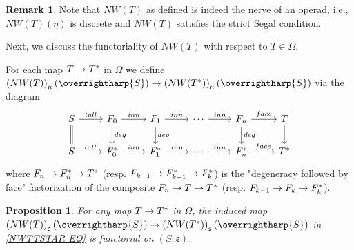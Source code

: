 \documentclass[a4paper,10pt
,draft
]{article}%
\numberwithin{equation}{section}
\numberwithin{figure}{section}
\newtheorem{proposition}[equation]{Proposition}%
\theoremstyle{definition} %
\newtheorem{remark}[equation]{Remark}%
\newcommand{\vect}[1]{\text{\overrightharp{\ensuremath{#1}}}}
\newcommand{\1}{\ensuremath{\mathbbm 1}}%
\begin{document}
\begin{remark}
	Note that 
	$NW(T)$ as defined is indeed the nerve of an operad, i.e., 
	$NW(T)(\eta)$ is discrete
	and
	$NW(T)$ satisfies the strict Segal condition.
\end{remark}




Next, we discuss the functoriality of
$NW(T)$ with respect to $T \in \Omega$.

For each map $T \to T^{\**}$ in $\Omega$
we define
$\left(NW(T)\right)_n(\vect{S})
\to 
\left(NW(T^{\**})\right)_n(\vect{S})$
via the diagram
\begin{equation}\label{NWTTSTAR EQ}
\begin{tikzcd}
	S \ar{r}{tall} \ar[equal]{d}
&
	F_0 \ar{r}{inn} \ar{d}{deg}
&
	F_1 \ar{r}{inn} \ar{d}{deg}
&
	\cdots \ar{r}{inn}
&
	F_n \ar{r}{face} \ar{d}{deg}
&
	T \ar{d}
\\
	S \ar{r}{tall} 
&
	F^{\**}_0 \ar{r}{inn}
&
	F^{\**}_1 \ar{r}{inn}
&
	\cdots \ar{r}{inn}
&
	F^{\**}_n \ar{r}{face}
&
	T^{\**}
\end{tikzcd}
\end{equation}
where
$F_n \to F^{\**}_n \to T^{\**}$
(resp. 
$F_{k-1} \to F^{\**}_{k-1} \to F^{\**}_k$)
is the "degeneracy followed by face"
factorization of the composite
$F_n \to T \to T^{\**}$
(resp.
$F_{k-1} \to F_{k} \to F^{\**}_k$).






\begin{proposition}
	For any map $T \to T^{\**}$ in $\Omega$, the induced map
	$\left(NW(T)\right)_{\mathfrak{s}}(\vect{S})
	\to 
	\left(NW(T^{\**})\right)_{\mathfrak{s}}(\vect{S})$
	in 
	\eqref{NWTTSTAR EQ}
	is functorial on $(S,\mathfrak{s})$.
\end{proposition}
\end{document}
